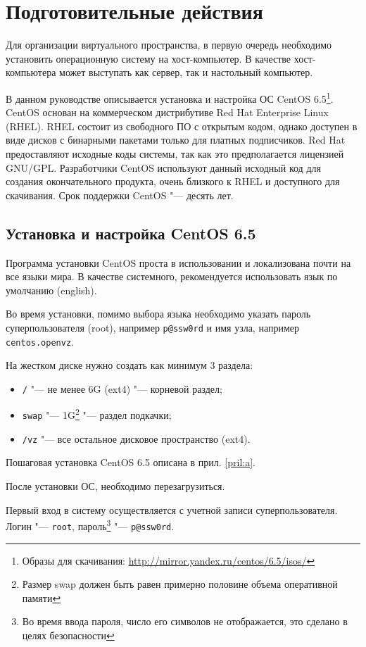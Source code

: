 \section{Подготовительные действия}

Для организации виртуального пространства, в первую очередь необходимо установить операционную систему на хост-компьютер. 
В качестве хост-компьютера может выступать как сервер, так и настольный компьютер.

В данном руководстве описывается установка и настройка ОС CentOS 6.5\footnote{Образы для скачивания: \url{http://mirror.yandex.ru/centos/6.5/isos/}}.
CentOS основан на коммерческом дистрибутиве Red Hat Enterprise Linux (RHEL). 
RHEL состоит из свободного ПО с открытым кодом, однако доступен в виде дисков с бинарными пакетами только для платных подписчиков. 
Red Hat предоставляют исходные коды системы, так как это предполагается лицензией GNU/GPL.
Разработчики CentOS используют данный исходный код для создания окончательного продукта, очень близкого к RHEL и доступного для скачивания.
Срок поддержки CentOS "--- десять лет.

\subsection{Установка и настройка CentOS 6.5}
Программа установки CentOS проста в использовании и локализована почти на все языки мира. 
В качестве системного, рекомендуется использовать язык по умолчанию (english).

Во время установки, помимо выбора языка необходимо указать пароль суперпользователя (root), например \texttt{p@ssw0rd} и имя узла, например \texttt{centos.openvz}.

На жестком диске нужно создать как минимум 3 раздела:
\begin{itemize}
\item \texttt{/} "--- не менее 6G (ext4) "--- корневой раздел;
\item \texttt{swap} "--- 1G\footnote{Размер swap должен быть равен примерно половине объема оперативной памяти} "--- раздел подкачки;
\item \texttt{/vz} "--- все остальное дисковое пространство (ext4).
\end{itemize}

Пошаговая установка CentOS 6.5 описана в прил. \ref{pril:a}.

После установки ОС, необходимо перезагрузиться.

Первый вход в систему осуществляется с учетной записи суперпользователя. Логин "--- \texttt{root}, пароль\footnote{Во время ввода пароля, число его символов не отображается, это сделано в целях безопасности} "--- \texttt{p@ssw0rd}.

